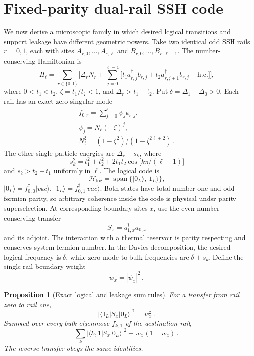 \documentclass[11pt,a4paper]{article}
\newtheorem{proposition}[theorem]{Proposition}
\theoremstyle{remark}
\begin{document}
\section{Fixed-parity dual-rail SSH code}
We now derive a microscopic family in which desired logical transitions and support leakage have different geometric powers.
Take two identical odd SSH rails $r=0,1$, each with sites
$A_{r,0},\ldots,A_{r,\ell}$ and $B_{r,0},\ldots,B_{r,\ell-1}$.
The number-conserving Hamiltonian is
\[
H_\ell=\sum_{r\in \{0,1\}} \bigl[\Delta_r N_r+\sum_{j=0}^{\ell-1}\bigl[t_1 a_{r,j}^{\dagger} b_{r,j}+t_2 a_{r,j+1}^{\dagger} b_{r,j}+\mathrm{h.c.}\bigr]\bigr]\mathpunct{,}
\]
where $0<t_1<t_2$, $\zeta=t_1/t_2<1$, and $\Delta_r>t_1+t_2$. Put $\delta=\Delta_1-\Delta_0>0$.
Each rail has an exact zero singular mode
\[
\begin{gathered}
f_{0,r}^{\dagger}=\sum_{j=0}^{\ell} \psi_j a_{r,j}^{\dagger}\mathpunct{,} \\
\psi_j=N_\ell(-\zeta)^j\mathpunct{,} \\
N_\ell^{2}=(1-\zeta^{2})/(1-\zeta^{2\ell+2})\mathpunct{.}
\end{gathered}
\]
The other single-particle energies are $\Delta_r\pm s_k$, where
\[
s_k^{2}=t_1^{2}+t_2^{2}+2t_1t_2 \cos\bigl[k \pi/(\ell+1)\bigr]
\]
and $s_k>t_2-t_1$ uniformly in $\ell$.
The logical code is
\[
\mathcal{H}_{\log}=\operatorname{span}\{\lvert 0_L\rangle{},\lvert 1_L\rangle{}\}\mathpunct{,}
\]
$\lvert 0_L\rangle{}=f_{0,0}^{\dagger}\lvert vac\rangle{}$,  $\lvert 1_L\rangle{}=f_{0,1}^{\dagger}\lvert vac\rangle{}$.
Both states have total number one and odd fermion parity, so arbitrary coherence inside the code is physical under parity superselection.
At corresponding boundary sites $x$, use the even number-conserving transfer
\[
S_x=a_{1,x}^{\dagger} a_{0,x}
\]
and its adjoint. The interaction with a thermal reservoir is parity respecting and conserves system fermion number. In the Davies decomposition, the desired logical frequency is $\delta$, while zero-mode-to-bulk frequencies are $\delta\pm s_k$.
Define the single-rail boundary weight
\[
w_x=|\psi_x|^{2}\mathpunct{.}
\]
\begin{proposition}[Exact logical and leakage sum rules]
For a transfer from rail zero to rail one,
\[
|\langle 1_L\rvert{}S_x\lvert 0_L\rangle{}|^{2}=w_x^{2}\mathpunct{.}
\]
Summed over every bulk eigenmode $f_{k,1}$ of the destination rail,
\[
\sum_{k} |\langle k,1\rvert{}S_x\lvert 0_L\rangle{}|^{2}=w_x(1-w_x)\mathpunct{.}
\]
The reverse transfer obeys the same identities.
\end{proposition}
\end{document}
